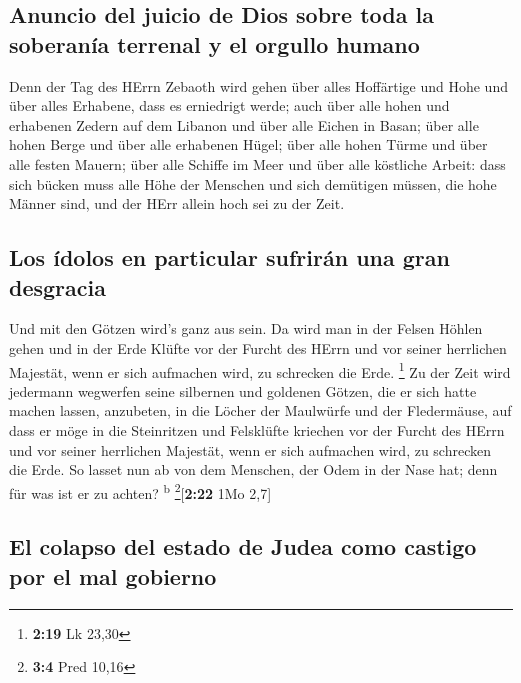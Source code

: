 \hypertarget{anuncio-del-juicio-de-dios-sobre-toda-la-soberanuxeda-terrenal-y-el-orgullo-humano}{%
\subsection{Anuncio del juicio de Dios sobre toda la soberanía terrenal
y el orgullo
humano}\label{anuncio-del-juicio-de-dios-sobre-toda-la-soberanuxeda-terrenal-y-el-orgullo-humano}}

 Denn der Tag des HErrn Zebaoth wird gehen über alles
Hoffärtige und Hohe und über alles Erhabene, dass es erniedrigt werde;
 auch über alle hohen und erhabenen Zedern auf dem
Libanon und über alle Eichen in Basan;  über alle hohen
Berge und über alle erhabenen Hügel;  über alle hohen
Türme und über alle festen Mauern;  über alle Schiffe im
Meer und über alle köstliche Arbeit:  dass sich bücken
muss alle Höhe der Menschen und sich demütigen müssen, die hohe Männer
sind, und der HErr allein hoch sei zu der Zeit.

\hypertarget{los-uxeddolos-en-particular-sufriruxe1n-una-gran-desgracia}{%
\subsection{Los ídolos en particular sufrirán una gran
desgracia}\label{los-uxeddolos-en-particular-sufriruxe1n-una-gran-desgracia}}

 Und mit den Götzen wird's ganz aus sein. 
Da wird man in der Felsen Höhlen gehen und in der Erde Klüfte vor der
Furcht des HErrn und vor seiner herrlichen Majestät, wenn er sich
aufmachen wird, zu schrecken die Erde. \footnote{\textbf{2:19} Lk 23,30}
 Zu der Zeit wird jedermann wegwerfen seine silbernen und
goldenen Götzen, die er sich hatte machen lassen, anzubeten, in die
Löcher der Maulwürfe und der Fledermäuse,  auf dass er
möge in die Steinritzen und Felsklüfte kriechen vor der Furcht des HErrn
und vor seiner herrlichen Majestät, wenn er sich aufmachen wird, zu
schrecken die Erde.  So lasset nun ab von dem Menschen,
der Odem in der Nase hat; denn für was ist er zu achten?
\textsuperscript{b} \footnote{\textbf{3:4} Pred 10,16}{[}\textbf{2:22}
1Mo 2,7{]}

\hypertarget{el-colapso-del-estado-de-judea-como-castigo-por-el-mal-gobierno}{%
\subsection{El colapso del estado de Judea como castigo por el mal
gobierno}\label{el-colapso-del-estado-de-judea-como-castigo-por-el-mal-gobierno}}

